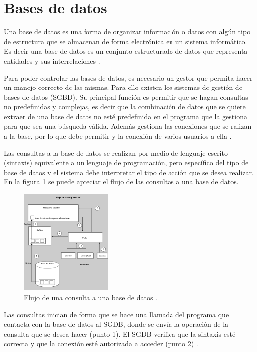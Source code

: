 \section{Bases de datos}
Una base de datos es una forma de organizar información o datos con algún tipo de estructura que se almacenan de forma electrónica en un sistema informático. Es decir una base de datos es un conjunto estructurado de datos que representa entidades y sus interrelaciones \cite{camps_paré_2005}.
\par
Para poder controlar las bases de datos, es necesario un gestor que permita hacer un manejo correcto de las mismas. Para ello existen los sistemas de gestión de bases de datos (SGBD). Su principal función es permitir que se hagan consultas no predefinidas y complejas, es decir que la combinación de datos que se quiere extraer de una base de datos no esté predefinida en el programa que la gestiona para que sea una búsqueda válida. Además gestiona las conexiones que se ralizan a la base, por lo que debe permitir y la conexión de varios usuarios a ella \cite{camps_paré_2005}.
\par
Las consultas a la base de datos se realizan por medio de lenguaje escrito (sintaxis) equivalente a un lenguaje de programación, pero específico del tipo de base de datos y el sistema debe interpretar el tipo de acción que se desea realizar. En la figura \ref{BDflux} se puede apreciar el flujo de las consultas a una base de datos. 
\begin{figure}[H]
    \centering
    \includegraphics[width=0.4\textwidth]{imagenes/marco teorico/flujo_BD.png}
    \caption{Flujo de una consulta a una base de datos \cite{camps_paré_2005}.}
    \label{BDflux}
\end{figure}
\par
Las consultas inician de forma que se hace una llamada del programa que contacta con la base de datos al SGDB, donde se envía la operación de la consulta que se desea hacer (punto 1). El SGDB verifica que la sintaxis esté correcta y que la conexión esté autorizada a acceder (punto 2) \cite{camps_paré_2005}. 
